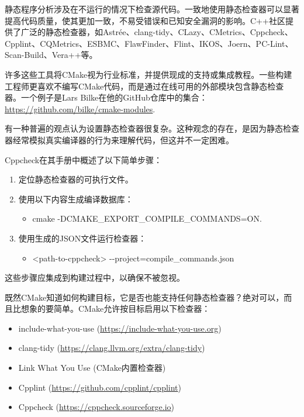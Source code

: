 
静态程序分析涉及在不运行的情况下检查源代码。一致地使用静态检查器可以显著提高代码质量，使其更加一致，不易受错误和已知安全漏洞的影响。C++社区提供了广泛的静态检查器，如Astrée、clang-tidy、CLazy、CMetrics、Cppcheck、Cpplint、CQMetrics、ESBMC、FlawFinder、Flint、IKOS、Joern、PC-Lint、Scan-Build、Vera++等。

许多这些工具将CMake视为行业标准，并提供现成的支持或集成教程。一些构建工程师更喜欢不编写CMake代码，而是通过在线可用的外部模块包含静态检查器。一个例子是Lars Bilke在他的GitHub仓库中的集合：\url{https://github.com/bilke/cmake-modules}.

有一种普遍的观点认为设置静态检查器很复杂。这种观念的存在，是因为静态检查器经常模拟真实编译器的行为来理解代码，但这并不一定困难。

Cppcheck在其手册中概述了以下简单步骤：

\begin{enumerate}
\item
定位静态检查器的可执行文件。

\item
使用以下内容生成编译数据库：
\begin{itemize}
\item
cmake -DCMAKE\_EXPORT\_COMPILE\_COMMANDS=ON.
\end{itemize}

\item
使用生成的JSON文件运行检查器：
\begin{itemize}
\item
<path-to-cppcheck> -{}-project=compile\_commands.json
\end{itemize}
\end{enumerate}

这些步骤应集成到构建过程中，以确保不被忽视。

既然CMake知道如何构建目标，它是否也能支持任何静态检查器？绝对可以，而且比想象的要简单。CMake允许按目标启用以下检查器：

\begin{itemize}
\item
include-what-you-use (\url{https://include-what-you-use.org})

\item
clang-tidy (\url{https://clang.llvm.org/extra/clang-tidy})

\item
Link What You Use (CMake内置检查器)

\item
Cpplint (\url{https://github.com/cpplint/cpplint})

\item
Cppcheck (\url{https://cppcheck.sourceforge.io})
\end{itemize}

